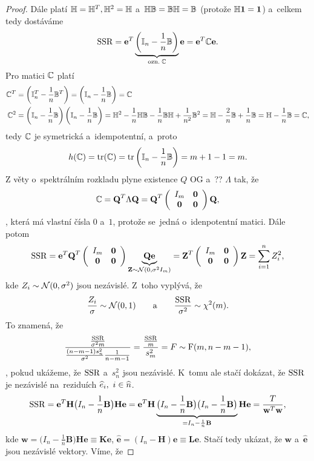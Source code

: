 \begin{proof}
Dále platí $\mathbb{H} = \mathbb{H}^T, \mathbb{H}^2 = \mathbb{H}$ a~$\mathbb{H} \mathbb{B} = \mathbb{B} \mathbb{H} = \mathbb{B}$ (protože $\mathbb{H} \mathbf{1} = \mathbf{1}$) a~celkem tedy dostáváme
 $$
\mathrm{SSR} = \textbf{e}^T \underbrace{\left(\mathbb{I}_{n} - \frac{1}{n} \mathbb{B} \right)}_{\text{ozn.} \; \mathbb{C}} \textbf{e} = \textbf{e}^T \mathbb{C} \textbf{e}.
 $$
Pro matici $\mathbb{C}$ platí
\begin{align*}
\mathbb{C}^T & = \left(\mathbb{I}_{n}^T - \frac{1}{n} \mathbb{B}^T \right) = \left(\mathbb{I}_{n} - \frac{1}{n} \mathbb{B} \right) = \mathbb{C} \\
\mathbb{C}^2 & = \left(\mathbb{I}_{n} - \frac{1}{n} \mathbb{B} \right)\left(\mathbb{I}_{n} - \frac{1}{n} \mathbb{B} \right) = \mathbb{H}^2 - \frac{1}{n} \mathbb{H} \mathbb{B} - \frac{1}{n} \mathbb{B} \mathbb{H} + \frac{1}{n^2} \mathbb{B}^2 = \mathbb{H} - \frac{2}{n} \mathbb{B} + \frac{1}{n} \mathbb{B} = \mathbb{H} - \frac{1}{n} \mathbb{B} = \mathbb{C},
\end{align*}
tedy $\mathbb{C}$ je symetrická a~idempotentní, a~proto
 $$
h(\mathbb{C}) = \text{tr}(\mathbb{C}) = \text{tr} \left(\mathbb{I}_{n} - \frac{1}{n} \mathbb{B} \right) = m + 1 - 1 = m.
 $$
Z věty o~spektrálním rozkladu plyne existence $Q$ OG a~?? $\Lambda$ tak, že
 $$ \mathbb{C} = \textbf{Q}^T \Lambda \textbf{Q} = \textbf{Q}^T \left(\begin{array}{cc}
I_m&\textbf{0}  \\
\textbf{0}& \textbf{0}
\end{array}
 \right)\textbf{Q}, $$
, která má vlastní čísla $0$ a~$1$, protože se~jedná o~idenpotentní matici. Dále potom
 $$ \mathrm{SSR} = \textbf{e}^T\textbf{Q}^T\left(\begin{array}{cc}
 I_m&\textbf{0}  \\
 \textbf{0}& \textbf{0}
 \end{array}
 \right)\underbrace{\textbf{Q}\textbf{e}}_{\textbf{Z}\sim\mathcal{N}(0,\sigma^2 I_m)} = \textbf{Z}^T\left(\begin{array}{cc}
 I_m&\textbf{0}  \\
 \textbf{0}& \textbf{0}
 \end{array}
 \right)\textbf{Z} = \sum_{i = 1}^n Z_i^2, $$
 kde $Z_i\sim\mathcal{N}(0,\sigma^2)$ jsou nezávislé. Z~toho vyplývá, že
 $$ \frac{Z_i}{\sigma}\sim\mathcal{N}(0,1)\qquad\text{a}\qquad\frac{\mathrm{SSR}}{\sigma^2}\sim\chi^2(m). $$
 To znamená, že
 $$ \frac{\frac{\mathrm{SSR}}{\sigma^2 m}}{\frac{(n-m-1)s_n^2}{\sigma^2}\frac{1}{n-m-1}} = \frac{\frac{\mathrm{SSR}}{m}}{s_m^2} = F\sim \mathrm{F}(m,n-m-1), $$
, pokud ukážeme, že $\mathrm{SSR}$ a~$s_n^2$ jsou nezávislé. K~tomu ale stačí dokázat, že $\mathrm{SSR}$ je nezávislé na~reziduích $\widehat{e}_i,~i\in\widehat{n}$.
 $$ \mathrm{SSR} = \textbf{e}^T\textbf{H}\big(I_n-\frac{1}{n}\textbf{B} \big)\textbf{H}\textbf{e} = \textbf{e}^T\textbf{H}\underbrace{\big(I_n-\frac{1}{n}\textbf{B}\big)\big(I_n-\frac{1}{n}\textbf{B}\big)}_{ = I_n-\frac{1}{n}\textbf{B}}\textbf{H}\textbf{e} = \frac{T}{\textbf{w}^T\textbf{w}}, $$
 kde $\textbf{w} = \big(I_n-\frac{1}{n}\textbf{B}\big)\textbf{H}\textbf{e}\equiv \textbf{K}\textbf{e}$, $\widehat{\textbf{e}} = (I_n-\textbf{H})\textbf{e}\equiv \textbf{L}\textbf{e}$. Stačí tedy ukázat, že $\textbf{w}$ a~$\widehat{\textbf{e}}$ jsou nezávislé vektory. Víme, že

\end{proof}
